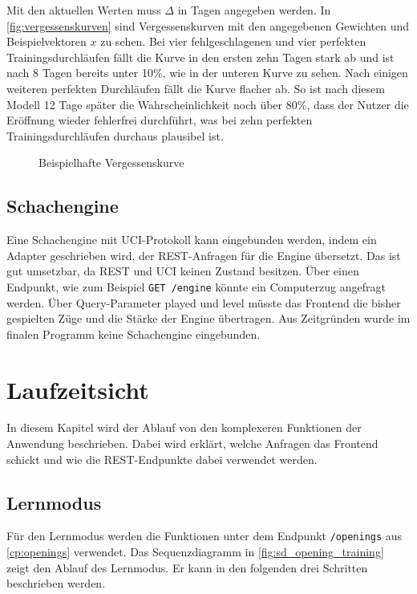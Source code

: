 Mit den aktuellen Werten muss $\Delta$ in Tagen angegeben werden. In \autoref{fig:vergessenskurven} sind Vergessenskurven mit den angegebenen Gewichten und Beispielvektoren $x$ zu sehen. Bei vier fehlgeschlagenen und vier perfekten Trainingsdurchläufen fällt die Kurve in den ersten zehn Tagen stark ab und ist nach 8 Tagen bereits unter 10\%, wie in der unteren Kurve zu sehen. Nach einigen weiteren perfekten Durchläufen fällt die Kurve flacher ab. So ist nach diesem Modell 12 Tage später die Wahrscheinlichkeit noch über 80\%, dass der Nutzer die Eröffnung wieder fehlerfrei durchführt, was bei zehn perfekten Trainingsdurchläufen durchaus plausibel ist.

\begin{figure}[htb]
    
    \caption{Beispielhafte Vergessenskurve}
    \label{fig:vergessenskurven}
\end{figure}

\subsection{Schachengine}
Eine Schachengine mit \ac{UCI}-Protokoll kann eingebunden werden, indem ein Adapter geschrieben wird, der \ac{REST}-Anfragen für die Engine übersetzt. Das ist gut umsetzbar, da REST und UCI keinen Zustand besitzen. Über einen Endpunkt, wie zum Beispiel \lstinline|GET /engine| könnte ein Computerzug angefragt werden. Über Query-Parameter played und level müsste das Frontend die bisher gespielten Züge und die Stärke der Engine übertragen. Aus Zeitgründen wurde im finalen Programm keine Schachengine eingebunden.

\section{Laufzeitsicht}

In diesem Kapitel wird der Ablauf von den komplexeren Funktionen der Anwendung beschrieben. Dabei wird erklärt, welche Anfragen das Frontend schickt und wie die REST-Endpunkte dabei verwendet werden.

\subsection{Lernmodus}
Für den Lernmodus werden die Funktionen unter dem Endpunkt \lstinline{/openings} aus \autoref{cp:openings} verwendet.
Das Sequenzdiagramm in \autoref{fig:sd_opening_training} zeigt den Ablauf des Lernmodus. Er kann in den folgenden drei Schritten beschrieben werden.

